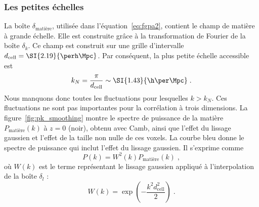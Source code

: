 \subsubsection{Les petites échelles}
La boîte $\delta_{\mathrm{matière}}$, utilisée dans l'équation~\ref{eq:fgpa2}, contient le champ de matière à grande échelle. Elle est construite grâce à la transformation de Fourier de la boîte $\delta_k$.
Ce champ est construit sur une grille d'intervalle $d_{\mathrm{cell}} = \SI{2.19}{\perh\Mpc}$. Par conséquent, la plus petite échelle accessible est
\begin{equation}
  k_N = \frac{\pi}{d_{\mathrm{cell}}} \sim \SI{1.43}{\h\per\Mpc} \; .
\end{equation}
Nous manquons donc toutes les fluctuations pour lesquelles $k > k_N$.
Ces fluctuations ne sont pas importantes pour la corrélation à trois dimensions. La figure~\ref{fig:pk_smoothing} montre le spectre de puissance de la matière $P_{\mathrm{matière}}(k)$ à $z=0$ (noir), obtenu avec Camb, ainsi que l'effet du lissage gaussien et l'effet de la taille non nulle de ces voxels.
  La courbe bleu donne le spectre de puissance qui inclut l'effet du lissage gaussien. Il s'exprime comme
  \begin{equation}
    P(k) =  W^2(k) P_{\mathrm{matière}}(k) \; ,
  \end{equation}
  où $W(k)$ est le terme représentant le lissage gaussien appliqué à l'interpolation de la boîte $\delta_l$ :
  \begin{equation}
    \label{eq:gauss_smoothing}
    W(k) = \exp(- \frac{k^2 d_{\mathrm{cell}}^2}{2}) \; .
  \end{equation}
